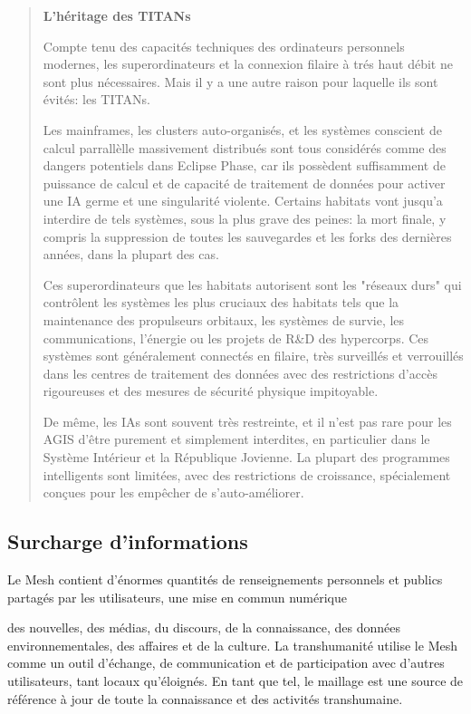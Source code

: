 \begin{quotation} \textbf{L'héritage des TITANs} 

Compte tenu des capacités techniques des ordinateurs personnels modernes, les superordinateurs et la connexion filaire à trés haut débit ne sont plus nécessaires. Mais il y a une autre raison pour laquelle ils sont évités: les TITANs. 

Les mainframes, les clusters auto-organisés, et les systèmes conscient de calcul parrallèlle massivement distribués sont tous considérés comme des dangers potentiels dans Eclipse Phase, car ils possèdent suffisamment de puissance de calcul et de capacité de traitement de données pour activer une IA germe et une singularité violente. Certains habitats vont jusqu'a interdire de tels systèmes, sous la plus grave des peines: la mort finale, y compris la suppression de toutes les sauvegardes et les forks des dernières années, dans la plupart des cas. 

Ces superordinateurs que les habitats autorisent sont les "réseaux durs" qui contrôlent les systèmes les plus cruciaux des habitats tels que la maintenance des propulseurs orbitaux, les systèmes de survie, les communications, l'énergie ou les projets de R\&D des hypercorps. Ces systèmes sont généralement connectés en filaire, très surveillés et verrouillés dans les centres de traitement des données avec des restrictions d'accès rigoureuses et des mesures de sécurité physique impitoyable. 

De même, les IAs sont souvent très restreinte, et il n'est pas rare pour les AGIS d'être purement et simplement interdites, en particulier dans le Système Intérieur et la République Jovienne. La plupart des programmes intelligents sont limitées, avec des restrictions de croissance, spécialement conçues pour les empêcher de s'auto-améliorer. \end{quotation} 

\subsection{Surcharge d'informations} 

Le Mesh contient d'énormes quantités de renseignements personnels et publics partagés par les utilisateurs, une mise en commun numérique 

des nouvelles, des médias, du discours, de la connaissance, des données environnementales, des affaires et de la culture. La transhumanité utilise le Mesh comme un outil d'échange, de communication et de participation avec d'autres utilisateurs, tant locaux qu'éloignés. En tant que tel, le maillage est une source de référence à jour de toute la connaissance et des activités transhumaine. 

